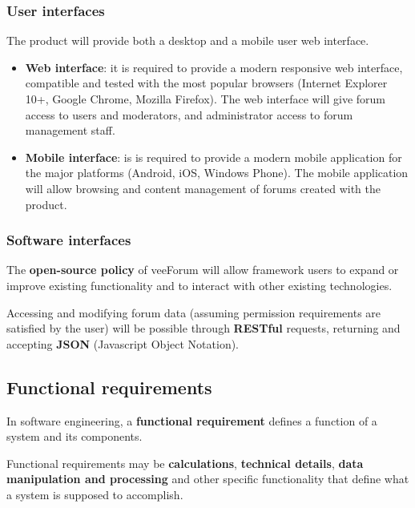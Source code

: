 \documentclass[12pt]{report}
\renewcommand\emph{\textbf}
\begin{document}
                    \subsubsection{User interfaces}
                        The product will provide both a desktop and a mobile user web interface.

                        \begin{itemize}
                            \item \emph{Web interface}: it is required to provide a modern responsive web interface, compatible and tested with the most popular browsers (Internet Explorer 10+, Google Chrome, Mozilla Firefox). The web interface will give forum access to users and moderators, and administrator access to forum management staff.
                            \item \emph{Mobile interface}: is is required to provide a modern mobile application for the major platforms (Android, iOS, Windows Phone). The mobile application will allow browsing and content management of forums created with the product.
                        \end{itemize}

                    \subsubsection{Software interfaces}
                        The \emph{open-source policy} of veeForum will allow framework users to expand or improve existing functionality and to interact with other existing technologies.

                        Accessing and modifying forum data (assuming permission requirements are satisfied by the user) will be possible through \emph{RESTful} requests, returning and accepting \emph{JSON} (Javascript Object Notation).

                \subsection{Functional requirements}
                    In software engineering, a \emph{functional requirement} defines a function of a system and its components.

                    Functional requirements may be \emph{calculations}, \emph{technical details}, \emph{data manipulation and processing} and other specific functionality that define what a system is supposed to accomplish.
\end{document}
